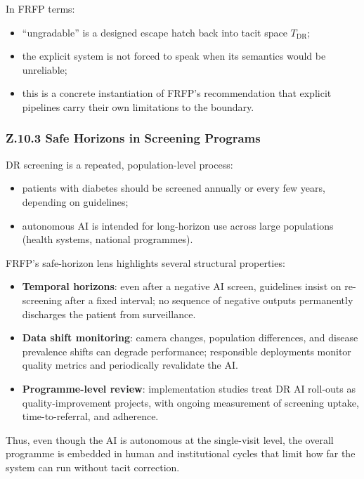 In FRFP terms:

\begin{itemize}
  \item ``ungradable'' is a designed escape hatch back into tacit space
        \(T_{\mathrm{DR}}\);
  \item the explicit system is not forced to speak when its semantics would
        be unreliable;
  \item this is a concrete instantiation of FRFP’s recommendation that
        explicit pipelines carry their own limitations to the boundary.
\end{itemize}

\subsubsection*{Z.10.3 Safe Horizons in Screening Programs}

DR screening is a repeated, population-level process:

\begin{itemize}
  \item patients with diabetes should be screened annually or every
        few years, depending on guidelines;
  \item autonomous AI is intended for long-horizon use across large
        populations (health systems, national programmes).
\end{itemize}

FRFP’s safe-horizon lens highlights several structural properties:

\begin{itemize}
  \item \textbf{Temporal horizons}:
        even after a negative AI screen, guidelines insist on re-screening
        after a fixed interval; no sequence of negative outputs permanently
        discharges the patient from surveillance.
  \item \textbf{Data shift monitoring}:
        camera changes, population differences, and disease prevalence
        shifts can degrade performance; responsible deployments monitor
        quality metrics and periodically revalidate the AI.
  \item \textbf{Programme-level review}:
        implementation studies treat DR AI roll-outs as quality-improvement
        projects, with ongoing measurement of screening uptake,
        time-to-referral, and adherence.
\end{itemize}

Thus, even though the AI is autonomous at the single-visit level, the
overall programme is embedded in human and institutional cycles that limit
how far the system can run without tacit correction.

